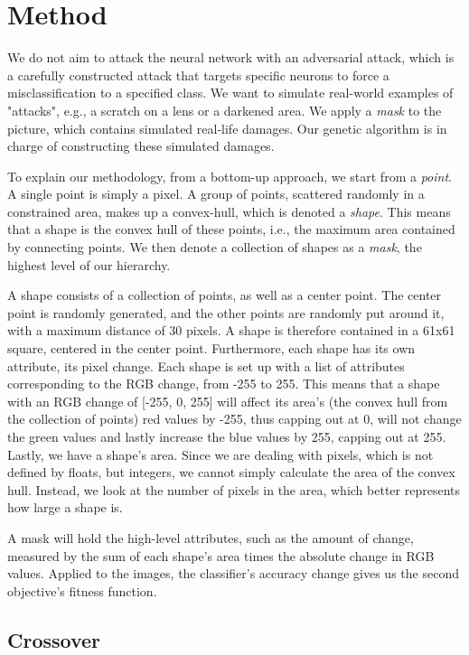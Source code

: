 \documentclass[conference]{IEEEtran}
\begin{document}
\section{Method}
We do not aim to attack the neural network with an adversarial attack, which is a carefully constructed attack that targets specific neurons to force a misclassification to a specified class.
We want to simulate real-world examples of "attacks", e.g., a scratch on a lens or a darkened area. 
We apply a \textit{mask} to the picture, which contains simulated real-life damages.
Our genetic algorithm is in charge of constructing these simulated damages.

To explain our methodology, from a bottom-up approach, we start from a \textit{point}.
A single point is simply a pixel.
A group of points, scattered randomly in a constrained area, makes up a convex-hull, which is denoted a \textit{shape}.
This means that a shape is the convex hull of these points, i.e., the maximum area contained by connecting points.
We then denote a collection of shapes as a \textit{mask}, the highest level of our hierarchy. 

A shape consists of a collection of points, as well as a center point.
The center point is randomly generated, and the other points are randomly put around it, with a maximum distance of 30 pixels.
A shape is therefore contained in a 61x61 square, centered in the center point.
Furthermore, each shape has its own attribute, its pixel change.
Each shape is set up with a list of attributes corresponding to the RGB change, from -255 to 255. 
This means that a shape with an RGB change of [-255, 0, 255] will affect its area's (the convex hull from the collection of points) red values by -255, thus capping out at 0, will not change the green values and lastly increase the blue values by 255, capping out at 255.
Lastly, we have a shape's area.
Since we are dealing with pixels, which is not defined by floats, but integers, we cannot simply calculate the area of the convex hull.
Instead, we look at the number of pixels in the area, which better represents how large a shape is. 

A mask will hold the high-level attributes, such as the amount of change, measured by the sum of each shape's area times the absolute change in RGB values. 
Applied to the images, the classifier's accuracy change gives us the second objective's fitness function.

\subsection{Crossover}
\end{document}
